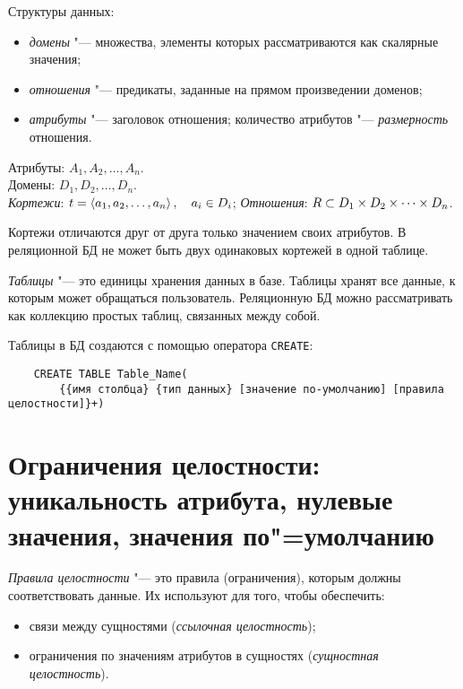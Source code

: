 Структуры данных:
\begin{itemize}
	\item \emph{домены} "--- множества, элементы которых рассматриваются как скалярные значения;
	\item \emph{отношения} "--- предикаты, заданные на прямом произведении доменов;
	\item \emph{атрибуты} "--- заголовок отношения; количество атрибутов "--- \emph{размерность} отношения.
\end{itemize}

Атрибуты: $ A_1, A_2, \dots, A_n $. \\
Домены: $ D_1, D_2, \dots, D_n $. \\
\emph{Кортежи}: $ t = \Braket{a_1, a_2, \dots, a_n}, \quad a_i \in D_i $;
\emph{Отношения}: $ R \subset D_1 \times D_2 \times \dots \times D_n $.

\begin{remark}
	Кортежи отличаются друг от друга только значением своих атрибутов.
	В реляционной БД не может быть двух одинаковых кортежей в одной таблице.
\end{remark}

\begin{definition}
	\emph{Таблицы} "--- это единицы хранения данных в базе.
	Таблицы хранят все данные, к которым может обращаться пользователь.
	Реляционную БД можно рассматривать как коллекцию простых таблиц, связанных между собой.
\end{definition}

Таблицы в БД создаются с помощью оператора \texttt{CREATE}:
\begin{verbatim}
	CREATE TABLE Table_Name(
		{{имя столбца} {тип данных} [значение по-умолчанию] [правила целостности]}+)
\end{verbatim}

\section{Ограничения целостности: уникальность атрибута, нулевые\tpst{\\}{} значения, значения по"=умолчанию}

\begin{definition}
	\emph{Правила целостности} "--- это правила (ограничения), которым должны соответствовать данные.
	Их используют для того, чтобы обеспечить:
	\begin{itemize}
		\item связи между сущностями (\emph{ссылочная целостность});
		\item ограничения по значениям атрибутов в сущностях (\emph{сущностная целостность}).
	\end{itemize}
\end{definition}

